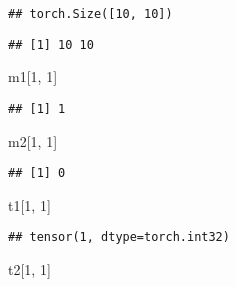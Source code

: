 \documentclass[]{book}
\newenvironment{Shaded}{\begin{snugshade}}{\end{snugshade}}
\newcommand{\DecValTok}[1]{\textcolor[rgb]{0.00,0.00,0.81}{#1}}
\newcommand{\KeywordTok}[1]{\textcolor[rgb]{0.13,0.29,0.53}{\textbf{#1}}}
\newcommand{\NormalTok}[1]{#1}
\newcommand{\OperatorTok}[1]{\textcolor[rgb]{0.81,0.36,0.00}{\textbf{#1}}}
\begin{document}
\begin{Shaded}
\end{Shaded}

\begin{verbatim}
## torch.Size([10, 10])
\end{verbatim}

\begin{Shaded}
\end{Shaded}

\begin{verbatim}
## [1] 10 10
\end{verbatim}

\begin{Shaded}
\begin{Highlighting}[]
\NormalTok{m1[}\DecValTok{1}\NormalTok{, }\DecValTok{1}\NormalTok{]}
\end{Highlighting}
\end{Shaded}

\begin{verbatim}
## [1] 1
\end{verbatim}

\begin{Shaded}
\begin{Highlighting}[]
\NormalTok{m2[}\DecValTok{1}\NormalTok{, }\DecValTok{1}\NormalTok{]}
\end{Highlighting}
\end{Shaded}

\begin{verbatim}
## [1] 0
\end{verbatim}

\begin{Shaded}
\begin{Highlighting}[]
\NormalTok{t1[}\DecValTok{1}\NormalTok{, }\DecValTok{1}\NormalTok{]}
\end{Highlighting}
\end{Shaded}

\begin{verbatim}
## tensor(1, dtype=torch.int32)
\end{verbatim}

\begin{Shaded}
\begin{Highlighting}[]
\NormalTok{t2[}\DecValTok{1}\NormalTok{, }\DecValTok{1}\NormalTok{]}
\end{Highlighting}
\end{Shaded}
\end{document}
